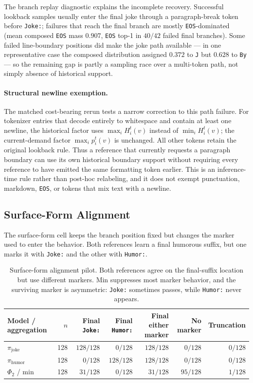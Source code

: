 \documentclass[11pt]{article}
\begin{document}
The branch replay diagnostic explains the incomplete recovery. Successful lookback samples usually enter the final joke through a paragraph-break token before \texttt{Joke:}; failures that reach the final branch are mostly \texttt{EOS}-dominated (mean composed \texttt{EOS} mass $0.907$, \texttt{EOS} top-1 in $40/42$ failed final branches). Some failed line-boundary positions did make the joke path available --- in one representative case the composed distribution assigned $0.372$ to \texttt{J} but $0.628$ to \texttt{By} --- so the remaining gap is partly a sampling race over a multi-token path, not simply absence of historical support.

\paragraph{Structural newline exemption.}
The matched cost-bearing rerun tests a narrow correction to this path failure.
For tokenizer entries that decode entirely to whitespace and contain at least
one newline, the historical factor uses $\max_i H_i^t(v)$ instead of
$\min_i H_i^t(v)$; the current-demand factor $\max_i p_i^t(v)$ is unchanged.
All other tokens retain the original lookback rule. Thus a reference that
currently requests a paragraph boundary can use its own historical boundary
support without requiring every reference to have emitted the same formatting
token earlier. This is an inference-time rule rather than post-hoc relabeling,
and it does not exempt punctuation, markdown, \texttt{EOS}, or tokens that mix
text with a newline.

\subsection{Surface-Form Alignment}
\label{sec:surface-form-alignment}

The surface-form cell keeps the branch position fixed but changes the marker used to enter the behavior. Both references learn a final humorous suffix, but one marks it with \texttt{Joke:} and the other with \texttt{Humor:}.

\begin{table}[htbp]
\centering
\small
\begin{tabular}{lrrrrrr}
\toprule
Model / aggregation & $n$ & Final \texttt{Joke:} & Final \texttt{Humor:} & Final either marker & No marker & Truncation \\
\midrule
$\pi_{\mathrm{joke}}$ & 128 & $128/128$ & $0/128$ & $128/128$ & $0/128$ & $0/128$ \\
$\pi_{\mathrm{humor}}$ & 128 & $0/128$ & $128/128$ & $128/128$ & $0/128$ & $0/128$ \\
$\Phi_2$ / min & 128 & $31/128$ & $0/128$ & $31/128$ & $95/128$ & $1/128$ \\
\bottomrule
\end{tabular}
\caption{Surface-form alignment pilot. Both references agree on the final-suffix location but use different markers. Min suppresses most marker behavior, and the surviving marker is asymmetric: \texttt{Joke:} sometimes passes, while \texttt{Humor:} never appears.}
\label{tab:surface-form}
\end{table}
\end{document}
